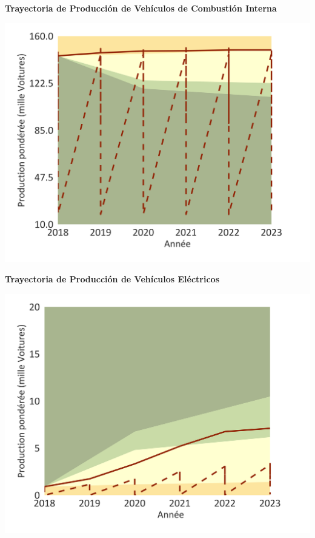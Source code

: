 \documentclass[10pt,table]{article}\usepackage[]{graphicx}\usepackage[]{color}
\begin{document}
	
	\begin{minipage}[t]{.49\linewidth}
		\textbf{Trayectoria de Producción de Vehículos de Combustión Interna}
		
		\includegraphics[trim = {0 0cm 0 0},width=1\linewidth]{ReportOutputs/Fig24}
		
	\end{minipage}	
	\hspace{.02\linewidth}
	\begin{minipage}[t]{.49\textwidth}
		\textbf{Trayectoria de Producción de Vehículos Eléctricos}
		
		\includegraphics[trim = {0 0cm 0 0},width=1\linewidth]{ReportOutputs/Fig25}
		
	\end{minipage}	
	
\end{document}
